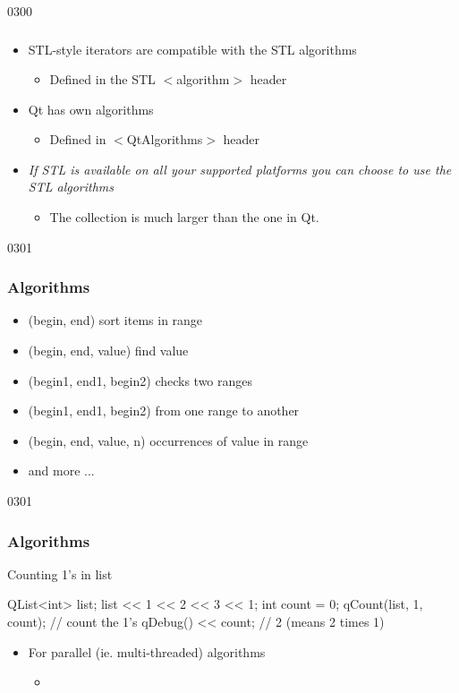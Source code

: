 \begin{slide}{0300}\frametitle{}
\begin{itemize}
  \item STL-style iterators are compatible with the STL algorithms
  \begin{itemize}
    \item Defined in the STL $<$algorithm$>$ header
  \end{itemize}
  \item Qt has own algorithms
  \begin{itemize}
    \item Defined in $<$QtAlgorithms$>$ header
  \end{itemize}
  \item \emph{If STL is available on all your supported platforms you can
      choose to use the STL algorithms}
  \begin{itemize}
    \item The collection is much larger than the one in Qt.
  \end{itemize}
\end{itemize}
\end{slide}

\begin{slide}[fragile]{0301}\frametitle{Algorithms}
\begin{itemize}
\item {}(begin, end) sort items in range
\item {}(begin, end, value) find value
\item {}(begin1, end1, begin2) checks two ranges
\item {}(begin1, end1, begin2) from one range to another
\item {}(begin, end, value, n) occurrences of value in range
\item and more ...
\end{itemize}
\end{slide}

\begin{slide}[fragile]{0301}\frametitle{Algorithms}
Counting 1's in list          
\begin{cpp}
QList<int> list;
list << 1 << 2 << 3 << 1;
int count = 0;
qCount(list, 1, count); // count the 1's
qDebug() << count;      // 2  (means 2 times 1)
\end{cpp}
\begin{itemize}
  \item For parallel (ie. multi-threaded) algorithms
  \begin{itemize}  
  	\item {}
  \end{itemize}
\end{itemize}    
\end{slide}

